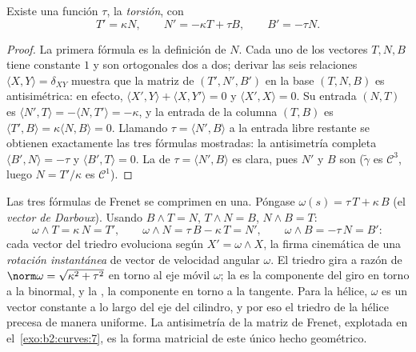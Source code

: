 \begin{theorem}\label{thm:b2:curves:frenet3d}
Existe una función  $\tau$, la \emph{torsión},
con
\[
T' = \kappa N, \qquad
N' = -\kappa T + \tau B, \qquad
B' = -\tau N .
\]
\end{theorem}

\begin{proof}
La primera fórmula es la definición de $N$. Cada uno de los vectores
$T, N, B$ tiene  constante $1$ y son ortogonales dos a dos;
derivar las seis relaciones $\langle X, Y\rangle = \delta_{XY}$
muestra que la matriz de $(T', N', B')$ en la base $(T, N, B)$ es
antisimétrica: en efecto, $\langle X', Y\rangle + \langle X,
Y'\rangle = 0$ y $\langle X', X\rangle = 0$. Su entrada $(N, T)$ es
$\langle N', T\rangle = -\langle N, T'\rangle = -\kappa$, y la
entrada de la columna $(T, B)$ es $\langle T', B\rangle =
\kappa\langle N, B\rangle = 0$. Llamando $\tau = \langle N',
B\rangle$ a la entrada libre restante se obtienen exactamente las
tres fórmulas mostradas: la antisimetría completa $\langle B',
N\rangle = -\tau$ y $\langle B', T\rangle = 0$. La  de
$\tau = \langle N', B\rangle$ es clara, pues $N'$ y $B$ son
 ($\tilde\gamma$ es $\mathcal{C}^3$, luego $N = T'/\kappa$ es
$\mathcal{C}^1$).
\end{proof}

\begin{example}\label{ex:b2:curves:darboux}
Las tres fórmulas de Frenet se comprimen en una. Póngase $\omega(s)
= \tau\,T + \kappa\,B$ (el \emph{vector de Darboux}). Usando $B
\wedge T = N$, $T \wedge N = B$, $N \wedge B = T$:
\[
\omega \wedge T = \kappa\,N = T', \qquad
\omega \wedge N = \tau\,B - \kappa\,T = N', \qquad
\omega \wedge B = -\tau\,N = B' :
\]
cada vector del triedro evoluciona según $X' = \omega \wedge X$, la
firma cinemática de una \emph{rotación instantánea} de vector de
velocidad angular $\omega$. El triedro gira a razón de $\norm\omega =
\sqrt{\kappa^2 + \tau^2}$ en torno al eje móvil $\omega$; la
 es la componente del giro en torno a la binormal, y la
, la componente en torno a la tangente. Para la hélice,
$\omega$ es un vector constante a lo largo del eje del cilindro, y
por eso el triedro de la hélice precesa de manera uniforme. La
antisimetría de la matriz de Frenet, explotada en el~\cref{exo:b2:curves:7}, es la forma matricial de este único hecho
geométrico.
\end{example}

